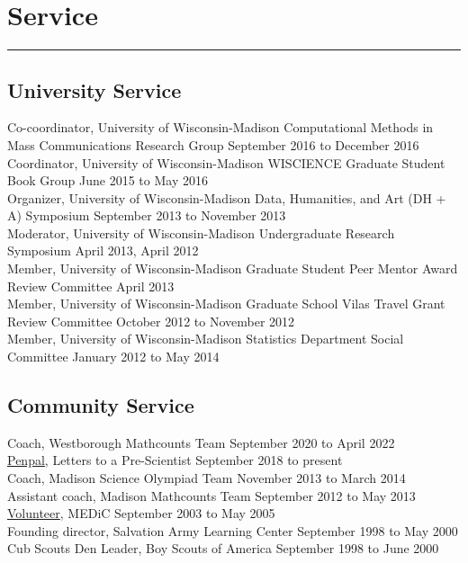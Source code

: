 \documentclass[
  10pt,
]
{article}
\begin{document}
\section{Service}\label{service}

\hrule

\subsection{University Service}\label{university-service}

\normalsize Co-coordinator, University of Wisconsin-Madison
Computational Methods in Mass Communications Research Group
\hfill September 2016 to December 2016\\
\normalsize Coordinator, University of Wisconsin-Madison WISCIENCE
Graduate Student Book Group \hfill June 2015 to May 2016\\
\normalsize Organizer, University of Wisconsin-Madison Data, Humanities,
and Art (DH + A) Symposium \hfill September 2013 to November 2013\\
\normalsize Moderator, University of Wisconsin-Madison Undergraduate
Research Symposium \hfill April 2013, April 2012\\
\normalsize Member, University of Wisconsin-Madison Graduate Student
Peer Mentor Award Review Committee \hfill April 2013\\
\normalsize Member, University of Wisconsin-Madison Graduate School
Vilas Travel Grant Review Committee \hfill October 2012 to November
2012\\
\normalsize Member, University of Wisconsin-Madison Statistics
Department Social Committee \hfill January 2012 to May 2014

\subsection{Community Service}\label{community-service}

\normalsize Coach, Westborough Mathcounts Team \hfill September 2020 to
April 2022\\
\normalsize \href{https://www.prescientist.org/}{Penpal}, Letters to a
Pre-Scientist \hfill September 2018 to present\\
\normalsize Coach, Madison Science Olympiad Team \hfill November 2013 to
March 2014\\
\normalsize Assistant coach, Madison Mathcounts Team \hfill September
2012 to May 2013\\
\normalsize \href{https://www.med.wisc.edu/education/medic/}{Volunteer},
MEDiC \hfill September 2003 to May 2005\\
\normalsize Founding director, Salvation Army Learning Center
\hfill September 1998 to May 2000\\
\normalsize Cub Scouts Den Leader, Boy Scouts of America
\hfill September 1998 to June 2000
\end{document}
